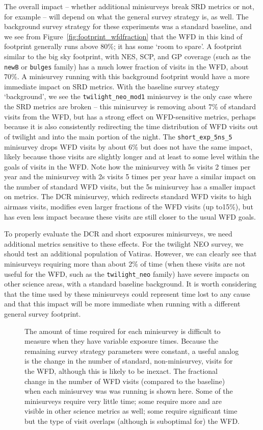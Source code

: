 The overall impact -- whether additional minisurveys break SRD metrics or not, for example -- will depend on what the general survey strategy is, as well. The background survey strategy for these experiments was a standard baseline, and we see from Figure~\ref{fig:footprint_wfdfraction} that the WFD in this kind of footprint generally runs above 80\%; it has some `room to spare'. A footprint similar to the big sky footprint, with NES, SCP, and GP coverage (such as the {\tt newB} or {\tt bulges} family) has a much lower fraction of visits in the WFD, about 70\%. A minisurvey running with this background footprint would have a more immediate impact on SRD metrics. With the baseline survey stategy `background', we see the {\tt twilight\_neo\_mod1} minisurvey is the only case where the SRD metrics are broken -- this minisurvey is removing about 7\% of standard visits from the WFD, but has a strong effect on WFD-sensitive metrics, perhaps because it is also consistently redirecting the time distribution of WFD visits out of twilight and into the main portion of the night. The {\tt short\_exp\_5ns\_5} minisurvey drops WFD visits by about 6\% but does not have the same impact, likely because those visits are slightly longer and at least to some level within the goals of visits in the WFD. Note how the minisurvey with 5s visits 2 times per year and the minisurvey with 2s visits 5 times per year have a similar impact on the number of standard WFD visits, but the 5s minisurvey has a smaller impact on metrics. The DCR minisurvey, which redirects standard WFD visits to high airmass visits, modifies even larger fractions of the WFD visits (up to15\%), but has even less impact because these visits are still closer to the usual WFD goals. 

To properly evaluate the DCR and short exposures minisurveys, we need additional metrics sensitive to these effects. For the twilight NEO survey, we should test an additional population of Vatiras. However, we can clearly see that minisurveys requiring more than about 2\% of time (when these visits are not useful for the WFD, such as the {\tt twilight\_neo} family) have severe impacts on other science areas, with a standard baseline background.  It is worth considering that the time used by these minisurveys could represent time lost to any cause and that this impact will be more immediate when running with a different general survey footprint.

\begin{figure}
\caption{The amount of time required for each minisurvey is difficult to measure when they have variable exposure times. Because the remaining survey strategy parameters were constant, a useful analog is the change in the number of standard, non-minisurvey, visits for the WFD, although this is likely to be inexact. The fractional change in the number of WFD visits (compared to the baseline) when each minisurvey was was running is shown here. Some of the minisurveys require very little time; some require more and are visible in other science metrics as well; some require significant time but the type of visit overlaps (although is suboptimal for) the WFD.}
\label{fig:minisurvey_time}
\end{figure}

